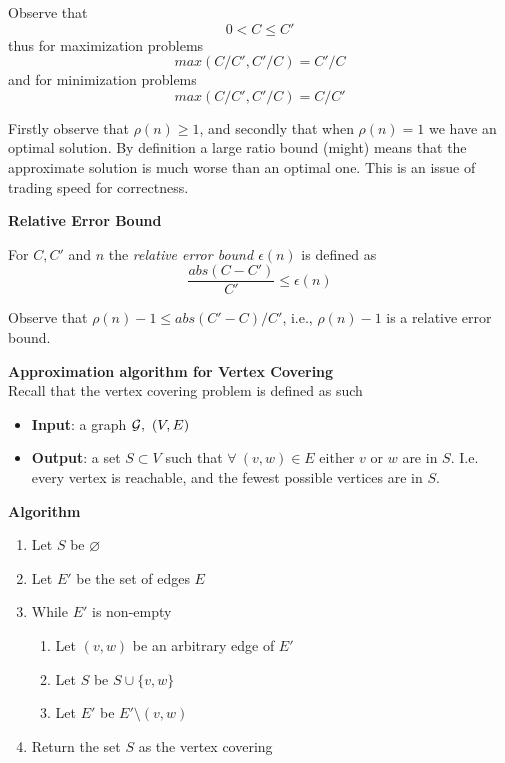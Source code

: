 Observe that
$$ 0 < C \leq C\prime $$
thus for maximization problems
$$ max(C/C\prime, C\prime/C) = C\prime/C $$
and for minimization problems
$$ max(C/C\prime, C\prime/C) = C/C\prime $$

Firstly observe that $\rho(n) \geq 1$,
and secondly that when $\rho(n) = 1$ we have an optimal solution.
By definition a large ratio bound (might) means that the approximate
solution is much worse than an optimal one.
This is an issue of trading speed for correctness.

\textbf{Relative Error Bound}\\
\begin{definition}
    For $C, C\prime$ and $n$  the \textit{relative error bound $\epsilon(n)$} is defined as
    $$\frac{abs(C - C\prime)}{C\prime} \leq \epsilon(n)$$
\end{definition}

Observe that $\rho(n) - 1 \leq abs(C\prime - C)/C\prime$,
i.e., $\rho(n) - 1$ is a relative error bound.

\textbf{Approximation algorithm for Vertex Covering}\\
Recall that the vertex covering problem is defined as such
\begin{itemize}
    \item \textbf{Input}:
        a graph $\G,\ (V,E)$
    \item \textbf{Output}:
        a set $S \subset V$ such that $\forall\ (v,w) \in E$
        either $v$ or $w$ are in $S$.
        I.e. every vertex is reachable,
        and the fewest possible vertices are in $S$.
\end{itemize}

\textbf{Algorithm}\\
\begin{enumerate}
    \item Let $S$ be $\varnothing$
    \item Let $E\prime$ be the set of edges $E$
    \item While $E\prime$ is non-empty
        \begin{enumerate}
            \item
                Let $(v,w)$ be an arbitrary edge of $E\prime$
            \item
                Let $S$ be $S \cup \{v,w\}$
            \item
                Let $E\prime$ be $E\prime \setminus (v,w)$
        \end{enumerate}
    \item Return the set $S$ as the vertex covering

\end{enumerate}

